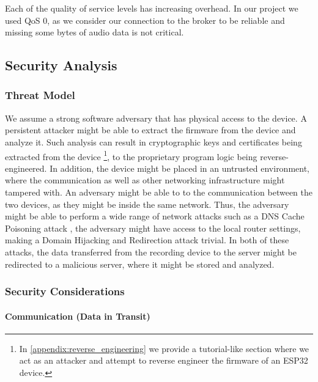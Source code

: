 \documentclass[conference]{IEEEtran}
\begin{document}
Each of the quality of service levels has increasing overhead. In our project
we used QoS 0, as we consider our connection to the broker to be reliable 
and missing some bytes of audio data is not critical.

\subsection{Security Analysis}
\label{subsec:security_analysis}


\subsubsection{Threat Model}

We assume a strong software adversary that has physical access to the device.
A persistent attacker might be able to extract the firmware from the device and
analyze it. Such analysis can result in cryptographic keys and certificates being extracted from the device
\footnote{In \cref{appendix:reverse_engineering} we provide a tutorial-like section where we act as an attacker and attempt to reverse engineer the firmware of an ESP32 device.}, 
to the proprietary program logic being reverse-engineered.
In addition, the device might be placed in an untrusted environment, where the communication as well 
as other networking infrastructure might tampered with.
An adversary might be able to  to the communication between the two devices,
as they might be inside the same network.
Thus, the adversary might be able to perform a wide range of network attacks such 
as a DNS Cache Poisoning attack \cite{Dissanayake_2018}, the adversary might have access to the local router 
settings, making a Domain Hijacking and Redirection attack \cite{DnsHijacking} trivial. In both of these attacks, 
the data transferred from the recording device to the server might be redirected to a malicious server, 
where it might be stored and analyzed.

\subsubsection{Security Considerations}

\paragraph{Communication (Data in Transit)}
\end{document}
